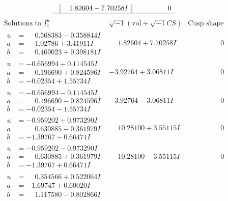 \documentclass[1p]{elsarticle_modified}
\theoremstyle{definition}
\newcommand{\I}{\sqrt{-1}}
\begin{document}
$$\begin{array}{c|c|c}
 & \phantom{-}1.82604 - 7.70258 I & \phantom{-0.000000 } 0\\
 \hline 
 \end{array}$$\newpage$$\begin{array}{c|c|c}  
\text{Solutions to }I^u_{1}& \I (\text{vol} + \sqrt{-1}CS) & \text{Cusp shape}\\
 \hline 
\begin{aligned}
u &= \phantom{-}0.568383 - 0.358844 I \\
a &= \phantom{-}1.02786 + 3.41911 I \\
b &= \phantom{-}0.469023 + 0.398181 I\end{aligned}
 & \phantom{-}1.82604 + 7.70258 I & \phantom{-0.000000 } 0 \\ \hline\begin{aligned}
u &= -0.656994 + 0.114545 I \\
a &= \phantom{-}0.196690 + 0.824596 I \\
b &= -0.02354 + 1.55734 I\end{aligned}
 & -3.92764 + 3.06811 I & \phantom{-0.000000 } 0 \\ \hline\begin{aligned}
u &= -0.656994 - 0.114545 I \\
a &= \phantom{-}0.196690 - 0.824596 I \\
b &= -0.02354 - 1.55734 I\end{aligned}
 & -3.92764 - 3.06811 I & \phantom{-0.000000 } 0 \\ \hline\begin{aligned}
u &= -0.959202 + 0.973290 I \\
a &= \phantom{-}0.630885 - 0.361979 I \\
b &= -1.39767 - 0.66471 I\end{aligned}
 & \phantom{-}10.28100 + 3.55115 I & \phantom{-0.000000 } 0 \\ \hline\begin{aligned}
u &= -0.959202 - 0.973290 I \\
a &= \phantom{-}0.630885 + 0.361979 I \\
b &= -1.39767 + 0.66471 I\end{aligned}
 & \phantom{-}10.28100 - 3.55115 I & \phantom{-0.000000 } 0 \\ \hline\begin{aligned}
u &= \phantom{-}0.354566 + 0.522064 I \\
a &= -1.69747 + 0.60020 I \\
b &= \phantom{-}1.117580 - 0.802866 I\end{aligned}

\end{array}$$
\end{document}

